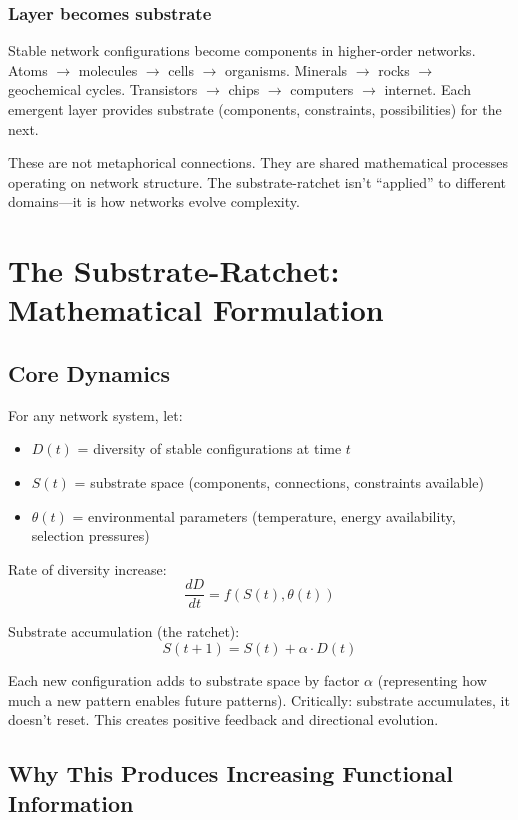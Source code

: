 \documentclass[12pt,a4paper]{article}
\begin{document}
\subsubsection{Layer becomes substrate}

Stable network configurations become components in higher-order networks. Atoms $\rightarrow$ molecules $\rightarrow$ cells $\rightarrow$ organisms. Minerals $\rightarrow$ rocks $\rightarrow$ geochemical cycles. Transistors $\rightarrow$ chips $\rightarrow$ computers $\rightarrow$ internet. Each emergent layer provides substrate (components, constraints, possibilities) for the next.

These are not metaphorical connections. They are shared mathematical processes operating on network structure. The substrate-ratchet isn't ``applied'' to different domains---it is how networks evolve complexity.

\section{The Substrate-Ratchet: Mathematical Formulation}

\subsection{Core Dynamics}

For any network system, let:
\begin{itemize}
    \item $D(t)$ = diversity of stable configurations at time $t$
    \item $S(t)$ = substrate space (components, connections, constraints available)
    \item $\theta(t)$ = environmental parameters (temperature, energy availability, selection pressures)
\end{itemize}

Rate of diversity increase:
\[
\frac{dD}{dt} = f(S(t), \theta(t))
\]

Substrate accumulation (the ratchet):
\[
S(t+1) = S(t) + \alpha \cdot D(t)
\]

Each new configuration adds to substrate space by factor $\alpha$ (representing how much a new pattern enables future patterns). Critically: substrate accumulates, it doesn't reset. This creates positive feedback and directional evolution.

\subsection{Why This Produces Increasing Functional Information}
\end{document}
